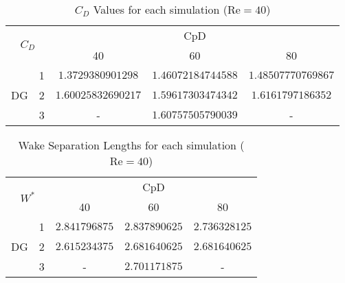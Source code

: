 \begin{table}[htp]
	\centering
	\def\arraystretch{1.5}
		\begin{tabular}{|c|c|c|c|c|}
			\hline
			\multicolumn{2}{|c|}{\multirow{2}{*}{$C_D$}} & \multicolumn{3}{c|}{CpD} \\ \cline{3-5} 
			\multicolumn{2}{|c|}{}                       & 40     & 60    & 80    \\ \hline
			\multirow{3}{*}{DG}            & 1           &   $1.3729380901298$     &     $1.46072184744588$  &     $1.48507770769867$   \\ \cline{2-5} 
			& 2           &     $1.60025832690217$   &   $1.59617303474342$    &     $1.6161797186352$   \\ \cline{2-5} 
			& 3           &      -  &     $1.60757505790039$  &     -   \\ \hline
		\end{tabular}
		\caption[$C_D$ Values for each simulation]{$C_D$ Values for each simulation ($\text{Re} = 40$)}	
		\label{C_D40}
	\end{table}
	\begin{table}[htp]
	\centering
	\def\arraystretch{1.5}
		\begin{tabular}{|c|c|c|c|c|}
			\hline
			\multicolumn{2}{|c|}{\multirow{2}{*}{$W^*$}} & \multicolumn{3}{c|}{CpD} \\ \cline{3-5} 
			\multicolumn{2}{|c|}{}                       & 40     & 60    & 80    \\ \hline
			\multirow{3}{*}{DG}            & 1           &    $2.841796875$    &    $2.837890625$   &    $2.736328125$    \\ \cline{2-5} 
			& 2           &     $2.615234375$   &    $2.681640625$   &     $2.681640625$   \\ \cline{2-5} 
			& 3           &     -   &    $2.701171875$   &    -    \\ \hline
		\end{tabular}
		\caption{Wake Separation Lengths for each simulation ($\text{Re} = 40$)}	
		\label{W40}
\end{table}
